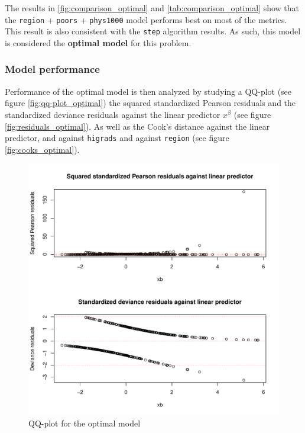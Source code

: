 \documentclass[a4paper]{article}
\begin{document}
The results in \ref{fig:comparison_optimal} and
\ref{tab:comparison_optimal} show that the \texttt{region} +
\texttt{poors} + \texttt{phys1000} model performs best on most of the
metrics. This result is also consistent with the \texttt{step} algorithm
results. As such, this model is considered the \textbf{optimal model}
for this problem.

\hypertarget{model-performance-1}{%
\subsubsection{Model performance}\label{model-performance-1}}

Performance of the optimal model is then analyzed by studying a QQ-plot
(see figure \ref{fig:qq-plot_optimal}) the squared standardized Pearson
residuals and the standardized deviance residuals against the linear
predictor \(x^{\beta}\) (see figure \ref{fig:residuals_optimal}). As
well as the Cook's distance against the linear predictor, and against
\texttt{higrads} and against \texttt{region} (see figure
\ref{fig:cooks_optimal}).

\newpage

\begin{figure}[h]
\includegraphics{Project_2_files/figure-latex/unnamed-chunk-23-1} \caption{\label{fig:qq-plot_optimal}QQ-plot for the optimal model}\label{fig:unnamed-chunk-23}
\end{figure}
\end{document}
